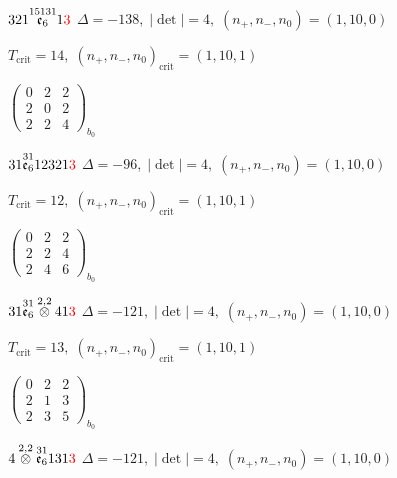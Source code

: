 \documentclass[10pt]{article}
\begin{document}
\smallskip

$321\overset{15131}{\mathfrak{e}_6}1\textcolor{red}{3}$ \quad $\Delta=-138,\; |\det|=4,\; (n_+,n_-,n_0)=(1,10,0)$

\hspace{1em}$T_{\text{crit}}=14,\; (n_+,n_-,n_0)_{\text{crit}}=(1,10,1)$

\hspace{2em}$\left(\begin{smallmatrix}0 & 2 & 2 \\ 2 & 0 & 2 \\ 2 & 2 & 4\end{smallmatrix}\right)_{\!b_0}$

\smallskip

$31\overset{31}{\mathfrak{e}_6}12321\textcolor{red}{3}$ \quad $\Delta=-96,\; |\det|=4,\; (n_+,n_-,n_0)=(1,10,0)$

\hspace{1em}$T_{\text{crit}}=12,\; (n_+,n_-,n_0)_{\text{crit}}=(1,10,1)$

\hspace{2em}$\left(\begin{smallmatrix}0 & 2 & 2 \\ 2 & 2 & 4 \\ 2 & 4 & 6\end{smallmatrix}\right)_{\!b_0}$

\smallskip

$31\overset{31}{\mathfrak{e}_6}\overset{2,2}{\otimes}41\textcolor{red}{3}$ \quad $\Delta=-121,\; |\det|=4,\; (n_+,n_-,n_0)=(1,10,0)$

\hspace{1em}$T_{\text{crit}}=13,\; (n_+,n_-,n_0)_{\text{crit}}=(1,10,1)$

\hspace{2em}$\left(\begin{smallmatrix}0 & 2 & 2 \\ 2 & 1 & 3 \\ 2 & 3 & 5\end{smallmatrix}\right)_{\!b_0}$

\smallskip

$4\overset{2,2}{\otimes}\overset{31}{\mathfrak{e}_6}131\textcolor{red}{3}$ \quad $\Delta=-121,\; |\det|=4,\; (n_+,n_-,n_0)=(1,10,0)$
\end{document}

